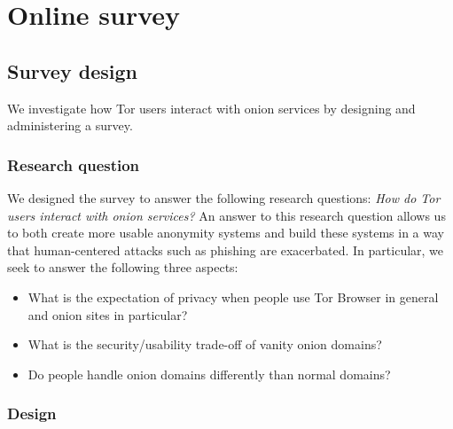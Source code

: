 \section{Online survey}
\label{sec:method}

\subsection{Survey design}
\label{sec:survey-design}

We investigate how Tor users interact with onion services by designing and
administering a survey.

\subsubsection{Research question}
We designed the survey to answer the following research questions: \emph{How do
Tor users interact with onion services?}  An answer to this research question
allows us to both create more usable anonymity systems and build these systems
in a way that human-centered attacks such as phishing are exacerbated.  In
particular, we seek to answer the following three aspects:

\begin{itemize}
    \item What is the expectation of privacy when people use Tor Browser in
        general and onion sites in particular?
    \item What is the security/usability trade-off of vanity onion domains?
    \item Do people handle onion domains differently than normal domains?
\end{itemize}

\subsubsection{Design}

